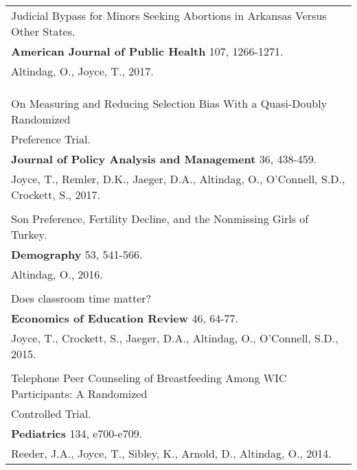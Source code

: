 \documentclass[12 pt]{article}
\begin{document}
\begin{longtable}{ccccc}
\\
   \multicolumn{5}{l}{Judicial Bypass for Minors Seeking Abortions in Arkansas Versus Other States.} \\
    \multicolumn{5}{l}{\textbf{American Journal of Public Health} 107, 1266-1271. 
} \\
    \multicolumn{5}{l}{Altindag, O., Joyce, T., 2017.}  \\
 
\\
\\
\\
   \multicolumn{5}{l}{On Measuring and Reducing Selection Bias With a Quasi-Doubly Randomized} \\
      \multicolumn{5}{l}{Preference Trial.} \\
     \multicolumn{5}{l}{\textbf{Journal of Policy Analysis and Management} 36, 438-459. } \\
      \multicolumn{5}{l}{Joyce, T., Remler, D.K., Jaeger, D.A., Altindag, O., O'Connell, S.D., Crockett, S., 2017. } \\

 \\

   \multicolumn{5}{l}{Son Preference, Fertility Decline, and the Nonmissing Girls of Turkey.} \\
     \multicolumn{5}{l}{\textbf{Demography}  53, 541-566. } \\
      \multicolumn{5}{l}{Altindag, O., 2016. } \\

\\
   \multicolumn{5}{l}{Does classroom time matter?} \\
     \multicolumn{5}{l}{\textbf{Economics of Education Review} 46, 64-77. } \\
      \multicolumn{5}{l}{Joyce, T., Crockett, S., Jaeger, D.A., Altindag, O., O'Connell, S.D., 2015.} \\

 \\

   \multicolumn{5}{l}{Telephone Peer Counseling of Breastfeeding Among WIC Participants: A Randomized} \\
      \multicolumn{5}{l}{ Controlled Trial.} \\
     \multicolumn{5}{l}{\textbf{Pediatrics} 134, e700-e709. } \\
      \multicolumn{5}{l}{Reeder, J.A., Joyce, T., Sibley, K., Arnold, D., Altindag, O., 2014. } \\



\end{longtable}
\end{document}
